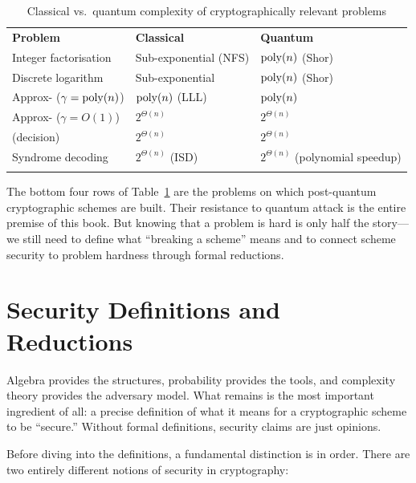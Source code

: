 \begin{table}[t]
\caption{Classical vs.\ quantum complexity of cryptographically relevant problems}
\label{tab:quantum-complexity}
\begin{tabular}{p{4cm}p{3.5cm}p{3.5cm}}
\hline\noalign{\smallskip}
\textbf{Problem} & \textbf{Classical} & \textbf{Quantum} \\
\noalign{\smallskip}\svhline\noalign{\smallskip}
Integer factorisation & Sub-exponential (NFS) & $\operatorname{poly}(n)$ (Shor) \\
Discrete logarithm & Sub-exponential & $\operatorname{poly}(n)$ (Shor) \\
Approx-\svp{} ($\gamma = \operatorname{poly}(n)$) & $\operatorname{poly}(n)$ (LLL) & $\operatorname{poly}(n)$ \\
Approx-\svp{} ($\gamma = O(1)$) & $2^{\Theta(n)}$ & $2^{\Theta(n)}$ \\
\lwe{} (decision) & $2^{\Theta(n)}$ & $2^{\Theta(n)}$ \\
Syndrome decoding & $2^{\Theta(n)}$ (ISD) & $2^{\Theta(n)}$ (polynomial speedup) \\
\noalign{\smallskip}\hline
\end{tabular}
\end{table}

The bottom four rows of Table~\ref{tab:quantum-complexity} are the problems on which post-quantum cryptographic schemes are built.  Their resistance to quantum attack is the entire premise of this book.  But knowing that a problem is hard is only half the story---we still need to define what ``breaking a scheme'' means and to connect scheme security to problem hardness through formal reductions.


\section{Security Definitions and Reductions}
\label{sec:security-defs}

Algebra provides the structures, probability provides the tools, and complexity theory provides the adversary model.  What remains is the most important ingredient of all: a precise definition of what it means for a cryptographic scheme to be ``secure.''  Without formal definitions, security claims are just opinions.

Before diving into the definitions, a fundamental distinction is in order.  There are two entirely different notions of security in cryptography:

